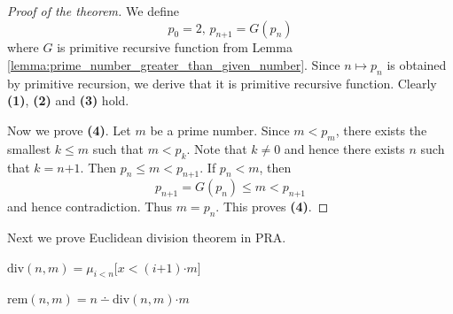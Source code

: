 \documentclass[10pt]{amsart}
\newcommand{\mle}{\boldsymbol{<}}
\newcommand{\mleq}{\boldsymbol{\leq}}
\newcommand{\meq}{\boldsymbol{=}}
\newcommand{\mneq}{\boldsymbol{\neq}}
\newcommand{\mplus}{\boldsymbol{+}}
\newcommand{\mdot}{\boldsymbol{\cdot}}
\begin{document}
\begin{proof}[Proof of the theorem]
	We define
	$$p_0 \meq 2,\,p_{n\mplus1} \meq G(p_n)$$
	where $G$ is primitive recursive function from Lemma \ref{lemma:prime_number_greater_than_given_number}. Since $n\mapsto p_n$ is obtained by primitive recursion, we derive that it is primitive recursive function. Clearly \textbf{(1)}, \textbf{(2)} and \textbf{(3)} hold.

	Now we prove \textbf{(4)}. Let $m$ be a prime number. Since $m \mle p_m$, there exists the smallest $k \mleq m$ such that $m \mle p_k$. Note that $k \mneq 0$ and hence there exists $n$ such that $k \meq n \mplus 1$. Then $p_n \mleq m \mle p_{n\mplus1}$. If $p_n \mle m$, then
	$$p_{n\mplus1} \meq G(p_n) \mleq m \mle p_{n\mplus1}$$
	and hence contradiction. Thus $m \meq p_n$. This proves \textbf{(4)}.
\end{proof}
\noindent
Next we prove Euclidean division theorem in $\mathrm{PRA}$.

\begin{definition}
	$\mathrm{div}(n,m) \meq \mu_{i \mle n}\big[x \mle (i \mplus 1)\mdot m\big]$
\end{definition}

\begin{definition}
	$\mathrm{rem}(n,m) \meq n \dotminus \mathrm{div}(n,m)\mdot m$
\end{definition}
\end{document}
